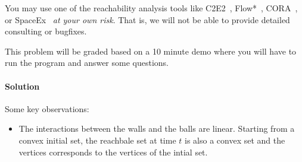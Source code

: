 \documentclass[11pt]{article}
\begin{document}
You may use one of the reachability analysis tools like C2E2~\cite{FanQM0D16}, Flow*~\cite{flow}, CORA~\cite{CORA16}, or SpaceEx~\cite{Spaceex} {\em at your own risk\/}. That is, we will not be able to provide detailed consulting or bugfixes.

This problem will be graded based on a 10 minute demo where you will have to run the program and answer some questions.

\paragraph{Solution}
Some key observations:
\begin{itemize}
  \item The interactions between the walls and the balls are linear. Starting from a convex initial set, the reachbale set at time $t$ is also a convex set and the vertices corresponds to the vertices of the intial set.
\end{itemize}


	
\end{document}
